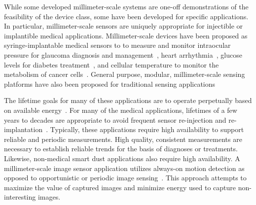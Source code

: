 While some developed millimeter-scale systems are one-off demonstrations of the feasibility of the device class, some have been developed for specific applications.
In particular, millimeter-scale sensors are uniquely appropriate for injectible or implantible medical applications.
Millimeter-scale devices have been proposed as syringe-implantable medical sensors to to measure and monitor
intraocular pressure for glaucoma diagnosis and management~\cite{ghaed2013circuits},
heart arrhythmia~\cite{chen2014injectable},
glucose levels for diabetes treatment~\cite{nazari2019novel}, and cellular temperature to monitor the metabolism of cancer cells~\cite{wu20180}.
General purpose, modular, millimeter-scale sensing platforms have also been proposed for traditional sensing applications~\cite{lee2013modular, kim2014millimeter}

The lifetime goals for many of these applications are to operate perpetually based on available energy~\cite{kim2014millimeter, lee2013modular}. For many of the medical applications, lifetimes of a few years to decades are appropriate to avoid frequent sensor re-injection and re-implantation~\cite{chen2014injectable}.
Typically, these applications require high availability to support reliable and periodic measurements.
High quality, consistent measurements are necessary to establish reliable trends for the basis of diagnoses or treatments.
Likewise, non-medical smart dust applications also require high availability.
A millimeter-scale image sensor application utilizes always-on motion detection as opposed to opportunistic or periodic image sensing~\cite{kim2014millimeter}.
This approach attempts to maximize the value of captured images and minimize energy used to capture non-interesting images.

